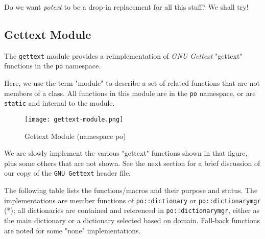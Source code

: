    Do we want \textsl{potext} to be a drop-in replacement for all this stuff?
   We shall try!

\subsection{Gettext Module}
\label{subsec:gettext_module}

   The \texttt{gettext} module provides a reimplementation of
   \textsl{GNU Gettext} "gettext" functions in the \texttt{po}
   namespace.

   Here, we use the term "module" to describe a set of related functions
   that are not members of a class.
   All functions in this module are in the \texttt{po}
   namespace, or are \texttt{static} and internal to the module.

\begin{figure}[H]
   \centering 
   \texttt{[image: gettext-module.png]}
   \caption{Gettext Module (namespace po)}
   \label{fig:gettext_module}
\end{figure}

   We are slowly implement the various "gettext" functions shown in that
   figure, plus some others that are not shown.
   See the next section for a brief discussion of our copy of the
   \texttt{GNU Gettext} header file.

   The following table lists the functions/macros and their purpose and status.
   The implementations are member functions of
   \texttt{po::dictionary} or
   \texttt{po::dictionarymgr} (*); all dictionaries are contained and
   referenced in \texttt{po::dictionarymgr}, either as the main dictionary
   or a dictionary selected based on domain.
   Fall-back functions are noted for some "none" implementations.

